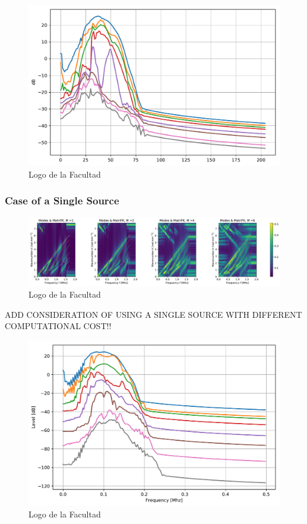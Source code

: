 \begin{figure}[!h]
	\centering
	\includegraphics[scale=.5]{images/TimeMultSous/2DTimeS8P3Elastic28_SV.pdf}
	\caption{Logo de la Facultad}
	\label{k765lsda}
\end{figure}



\subsubsection{Case of a Single Source}

\begin{figure}[!h]
	\centering
	\includegraphics[scale=.5]{images/TimeSingSous/2DTime_P7ElasticFK30M1460_y.pdf}
	\caption{Logo de la Facultad}
	\label{kldmalgdfgdsda}
\end{figure}

ADD CONSIDERATION OF USING A SINGLE SOURCE WITH DIFFERENT COMPUTATIONAL COST!!
\begin{figure}[!h]
	\centering
	\includegraphics[scale=.5]{images/TimeSingSous/2DTime_P7Elastic30_SV.pdf}
	\caption{Logo de la Facultad}
	\label{kldmalsda}
\end{figure}

